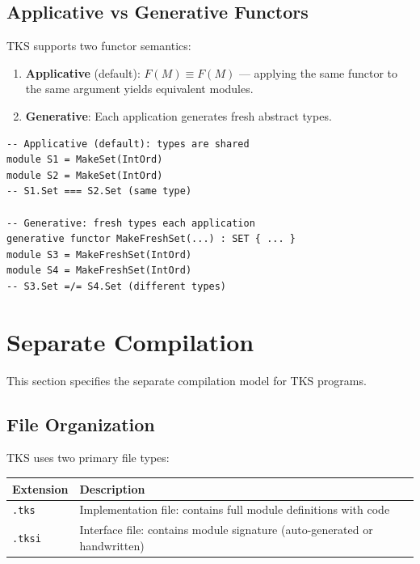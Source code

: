 \subsection{Applicative vs Generative Functors}
\label{subsec:applicative-generative}

\begin{definition}
\label{def:functor-semantics}
TKS supports two functor semantics:
\begin{enumerate}
  \item \textbf{Applicative} (default): $F(M) \equiv F(M)$ --- applying the same functor to the same argument yields equivalent modules.
  \item \textbf{Generative}: Each application generates fresh abstract types.
\end{enumerate}
\begin{verbatim}
-- Applicative (default): types are shared
module S1 = MakeSet(IntOrd)
module S2 = MakeSet(IntOrd)
-- S1.Set === S2.Set (same type)

-- Generative: fresh types each application
generative functor MakeFreshSet(...) : SET { ... }
module S3 = MakeFreshSet(IntOrd)
module S4 = MakeFreshSet(IntOrd)
-- S3.Set =/= S4.Set (different types)
\end{verbatim}
\end{definition}

\section{Separate Compilation}
\label{sec:separate-compilation}

This section specifies the separate compilation model for TKS programs.

\subsection{File Organization}
\label{subsec:file-organization}

\begin{definition}
\label{def:file-types}
TKS uses two primary file types:
\begin{center}
\begin{tabular}{lp{9cm}}
\toprule
\textbf{Extension} & \textbf{Description} \\
\midrule
\texttt{.tks} & Implementation file: contains full module definitions with code \\
\texttt{.tksi} & Interface file: contains module signature (auto-generated or handwritten) \\
\bottomrule
\end{tabular}
\end{center}
\end{definition}


